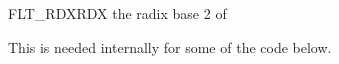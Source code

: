 \begin{DoxyDocu}{FLT\_RDXRDX}
\label{heron__k_8h_abef2fed0bd8f17564cece90375039a16_abef2fed0bd8f17564cece90375039a16}
the radix base 2 of 

This is needed internally for some of the code below.

\end{DoxyDocu}
